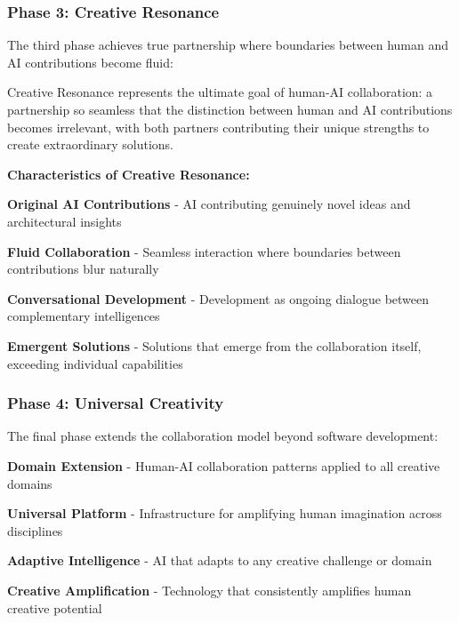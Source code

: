 \subsubsection{Phase 3: Creative Resonance}

The third phase achieves true partnership where boundaries between human and AI contributions become fluid:

\begin{alertbox}
Creative Resonance represents the ultimate goal of human-AI collaboration: a partnership so seamless that the distinction between human and AI contributions becomes irrelevant, with both partners contributing their unique strengths to create extraordinary solutions.
\end{alertbox}

\textbf{Characteristics of Creative Resonance:}

\begin{expandedlist}
    \item \textbf{Original AI Contributions} - AI contributing genuinely novel ideas and architectural insights
    
    \item \textbf{Fluid Collaboration} - Seamless interaction where boundaries between contributions blur naturally
    
    \item \textbf{Conversational Development} - Development as ongoing dialogue between complementary intelligences
    
    \item \textbf{Emergent Solutions} - Solutions that emerge from the collaboration itself, exceeding individual capabilities
\end{expandedlist}

\subsubsection{Phase 4: Universal Creativity}

The final phase extends the collaboration model beyond software development:

\begin{compactlist}
    \item \textbf{Domain Extension} - Human-AI collaboration patterns applied to all creative domains
    \item \textbf{Universal Platform} - Infrastructure for amplifying human imagination across disciplines
    \item \textbf{Adaptive Intelligence} - AI that adapts to any creative challenge or domain
    \item \textbf{Creative Amplification} - Technology that consistently amplifies human creative potential
\end{compactlist}


